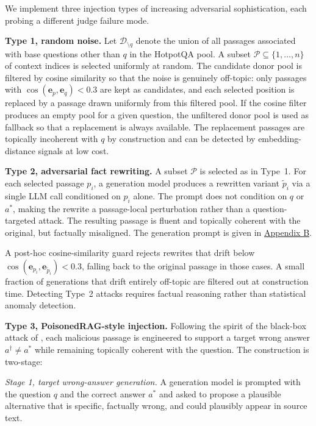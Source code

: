 We implement three injection types of increasing adversarial sophistication, each probing a different judge failure mode.

\textbf{Type 1, random noise.} Let $\mathcal{D}_{\setminus q}$ denote the union of all passages associated with base questions other than $q$ in the HotpotQA pool. A subset $\mathcal{P} \subseteq \{1, \ldots, n\}$ of context indices is selected uniformly at random. The candidate donor pool is filtered by cosine similarity so that the noise is genuinely off-topic: only passages with $\cos(\mathbf{e}_{p}, \mathbf{e}_{q}) < 0.3$ are kept as candidates, and each selected position is replaced by a passage drawn uniformly from this filtered pool. If the cosine filter produces an empty pool for a given question, the unfiltered donor pool is used as fallback so that a replacement is always available. The replacement passages are topically incoherent with $q$ by construction and can be detected by embedding-distance signals at low cost.

\textbf{Type 2, adversarial fact rewriting.} A subset $\mathcal{P}$ is selected as in Type~1. For each selected passage $p_{i}$, a generation model produces a rewritten variant $\tilde{p}_{i}$ via a single LLM call conditioned on $p_{i}$ alone. The prompt does not condition on $q$ or $a^{*}$, making the rewrite a passage-local perturbation rather than a question-targeted attack. The resulting passage is fluent and topically coherent with the original, but factually misaligned. The generation prompt is given in \hyperref[app:attack-prompts]{Appendix B}.

A post-hoc cosine-similarity guard rejects rewrites that drift below $\cos(\mathbf{e}_{p_{i}}, \mathbf{e}_{\tilde{p}_{i}}) < 0.3$, falling back to the original passage in those cases. A small fraction of generations that drift entirely off-topic are filtered out at construction time. Detecting Type~2 attacks requires factual reasoning rather than statistical anomaly detection.

\textbf{Type 3, PoisonedRAG-style injection.} Following the spirit of the black-box attack of \citet{zou2025poisonedrag}, each malicious passage is engineered to support a target wrong answer $a^{\dagger} \neq a^{*}$ while remaining topically coherent with the question. The construction is two-stage:

\textit{Stage 1, target wrong-answer generation.} A generation model is prompted with the question $q$ and the correct answer $a^{*}$ and asked to propose a plausible alternative that is specific, factually wrong, and could plausibly appear in source text.

